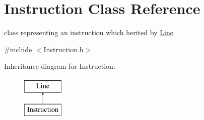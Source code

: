 \hypertarget{class_instruction}{\section{Instruction Class Reference}
\label{class_instruction}
}


class representing an instruction which herited by \hyperlink{class_line}{Line}  




{\ttfamily \#include $<$Instruction.\-h$>$}

Inheritance diagram for Instruction\-:\begin{figure}[H]
\begin{center}
\leavevmode
\includegraphics[height=2.000000cm]{class_instruction}
\end{center}
\end{figure}
